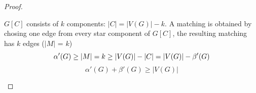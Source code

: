 \documentclass[notitlepage, 12pt]{article}
\begin{document}
\begin{proof}
\begin{itemize}
\begin{figure}[h]
    \centering
  \end{figure}
  $G[C]$ consists of $k$ components: $|C| = |V(G)| - k$. A matching is obtained
  by chosing one edge from every star component of $G[C]$, the resulting matching
  has $k$ edges ($|M|$ = $k$)
  \begin{equation*}
    \alpha'(G) \geq |M| = k \geq |V(G)| -|C| = |V(G)| - \beta'(G)\\
  \end{equation*}
  \begin{equation*}
    \alpha'(G) + \beta'(G) \geq |V(G)|
  \end{equation*}
\end{itemize}
\end{proof}
\end{document}
